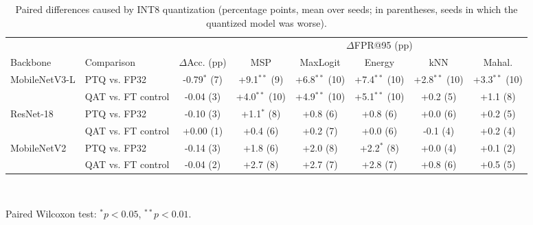 \begin{table}[t]
\centering
\caption{Paired differences caused by INT8 quantization (percentage points, mean over seeds; in parentheses, seeds in which the quantized model was worse).}
\label{tab:paired}
\setlength{\tabcolsep}{3pt}
\footnotesize
\begin{tabular}{llcccccc}
\toprule
 & & & \multicolumn{5}{c}{$\Delta$FPR@95 (pp)} \\
\cmidrule(lr){4-8}
Backbone & Comparison & $\Delta$Acc. (pp) & MSP & MaxLogit & Energy & kNN & Mahal. \\
\midrule
MobileNetV3-L & PTQ vs. FP32 & -0.79$^{*}$ (7) & +9.1$^{**}$ (9) & +6.8$^{**}$ (10) & +7.4$^{**}$ (10) & +2.8$^{**}$ (10) & +3.3$^{**}$ (10) \\
 & QAT vs. FT control & -0.04 (3) & +4.0$^{**}$ (10) & +4.9$^{**}$ (10) & +5.1$^{**}$ (10) & +0.2 (5) & +1.1 (8) \\
\midrule
ResNet-18 & PTQ vs. FP32 & -0.10 (3) & +1.1$^{*}$ (8) & +0.8 (6) & +0.8 (6) & +0.0 (6) & +0.2 (5) \\
 & QAT vs. FT control & +0.00 (1) & +0.4 (6) & +0.2 (7) & +0.0 (6) & -0.1 (4) & +0.2 (4) \\
\midrule
MobileNetV2 & PTQ vs. FP32 & -0.14 (3) & +1.8 (6) & +2.0 (8) & +2.2$^{*}$ (8) & +0.0 (4) & +0.1 (2) \\
 & QAT vs. FT control & -0.04 (2) & +2.7 (8) & +2.7 (7) & +2.8 (7) & +0.8 (6) & +0.5 (5) \\
\bottomrule
\end{tabular}
\\[2pt]\parbox{\linewidth}{\scriptsize Paired Wilcoxon test: $^{*}p<0.05$, $^{**}p<0.01$.}
\end{table}